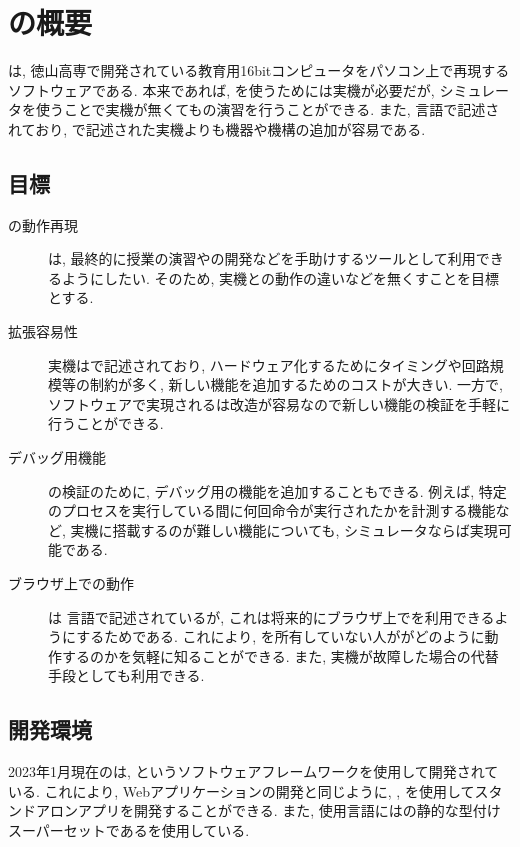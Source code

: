 \chapter{\tacsim の概要}

\tacsim は, 徳山高専で開発されている教育用16bitコンピュータ\tac をパソコン上で再現するソフトウェアである. 本来であれば, \tac を使うためには実機が必要だが, シミュレータを使うことで実機が無くても\tac の演習を行うことができる. また, \ts 言語で記述されており, \vhdl で記述された実機よりも機器や機構の追加が容易である.

\section{目標}

\begin{description}
    \item[ \tac の動作再現 ] \tacsim は, 最終的に授業の演習や\tacos の開発などを手助けするツールとして利用できるようにしたい. そのため, 実機との動作の違いなどを無くすことを目標とする.
    \item[ 拡張容易性 ] \tac 実機は\vhdl で記述されており, ハードウェア化するためにタイミングや回路規模等の制約が多く, 新しい機能を追加するためのコストが大きい. 一方で, ソフトウェアで実現される\tacsim は改造が容易なので新しい機能の検証を手軽に行うことができる.
    \item[ デバッグ用機能 ] \tac の検証のために, デバッグ用の機能を追加することもできる. 例えば, 特定のプロセスを実行している間に何回命令が実行されたかを計測する機能など, 実機に搭載するのが難しい機能についても, シミュレータならば実現可能である. 
    \item[ ブラウザ上での動作 ] \tacsim は \ts 言語で記述されているが, これは将来的にブラウザ上で\tac を利用できるようにするためである. これにより, \tac を所有していない人が\tac がどのように動作するのかを気軽に知ることができる. また, 実機が故障した場合の代替手段としても利用できる.
\end{description}

\section{開発環境}

2023年1月現在の\tacsim は, \electron というソフトウェアフレームワークを使用して開発されている. これにより, Webアプリケーションの開発と同じように\html , \css , \js を使用してスタンドアロンアプリを開発することができる. また, 使用言語には\js の静的な型付けスーパーセットである\ts を使用している.

